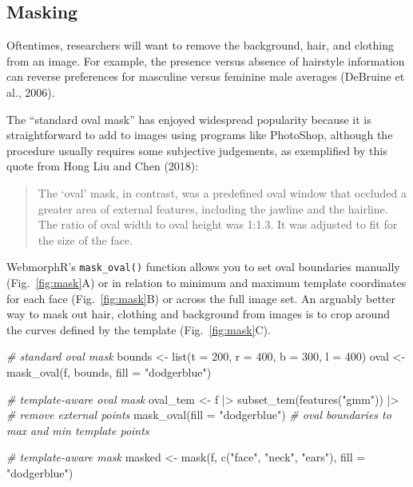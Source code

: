 \documentclass[
  doc,floatsintext]{apa6}
\newenvironment{Shaded}{\begin{snugshade}}{\end{snugshade}}
\newcommand{\AttributeTok}[1]{\textcolor[rgb]{0.77,0.63,0.00}{#1}}
\newcommand{\CommentTok}[1]{\textcolor[rgb]{0.56,0.35,0.01}{\textit{#1}}}
\newcommand{\DecValTok}[1]{\textcolor[rgb]{0.00,0.00,0.81}{#1}}
\newcommand{\FunctionTok}[1]{\textcolor[rgb]{0.00,0.00,0.00}{#1}}
\newcommand{\NormalTok}[1]{#1}
\newcommand{\OtherTok}[1]{\textcolor[rgb]{0.56,0.35,0.01}{#1}}
\newcommand{\SpecialCharTok}[1]{\textcolor[rgb]{0.00,0.00,0.00}{#1}}
\newcommand{\StringTok}[1]{\textcolor[rgb]{0.31,0.60,0.02}{#1}}
\begin{document}
\hypertarget{masking}{%
\subsection{Masking}\label{masking}}

Oftentimes, researchers will want to remove the background, hair, and clothing from an image. For example, the presence versus absence of hairstyle information can reverse preferences for masculine versus feminine male averages (DeBruine et al., 2006).

The ``standard oval mask'' has enjoyed widespread popularity because it is straightforward to add to images using programs like PhotoShop, although the procedure usually requires some subjective judgements, as exemplified by this quote from Hong Liu and Chen (2018):

\begin{quote}
The `oval' mask, in contrast, was a predefined oval window that occluded a greater area of external features, including the jawline and the hairline. The ratio of oval width to oval height was 1:1.3. It was adjusted to fit for the size of the face.
\end{quote}

WebmorphR's \texttt{mask\_oval()} function allows you to set oval boundaries manually (Fig.~\ref{fig:mask}A) or in relation to minimum and maximum template coordinates for each face (Fig.~\ref{fig:mask}B) or across the full image set. An arguably better way to mask out hair, clothing and background from images is to crop around the curves defined by the template (Fig.~\ref{fig:mask}C).

\begin{Shaded}
\begin{Highlighting}[]
\CommentTok{\# standard oval mask}
\NormalTok{bounds }\OtherTok{\textless{}{-}} \FunctionTok{list}\NormalTok{(}\AttributeTok{t =} \DecValTok{200}\NormalTok{, }\AttributeTok{r =} \DecValTok{400}\NormalTok{, }\AttributeTok{b =} \DecValTok{300}\NormalTok{, }\AttributeTok{l =} \DecValTok{400}\NormalTok{)}
\NormalTok{oval }\OtherTok{\textless{}{-}} \FunctionTok{mask\_oval}\NormalTok{(f, bounds, }\AttributeTok{fill =} \StringTok{"dodgerblue"}\NormalTok{)}

\CommentTok{\# template{-}aware oval mask}
\NormalTok{oval\_tem }\OtherTok{\textless{}{-}}\NormalTok{ f }\SpecialCharTok{|\textgreater{}}
  \FunctionTok{subset\_tem}\NormalTok{(}\FunctionTok{features}\NormalTok{(}\StringTok{"gmm"}\NormalTok{)) }\SpecialCharTok{|\textgreater{}} \CommentTok{\# remove external points}
  \FunctionTok{mask\_oval}\NormalTok{(}\AttributeTok{fill =} \StringTok{"dodgerblue"}\NormalTok{) }\CommentTok{\# oval boundaries to max and min template points}

\CommentTok{\# template{-}aware mask}
\NormalTok{masked }\OtherTok{\textless{}{-}} \FunctionTok{mask}\NormalTok{(f, }\FunctionTok{c}\NormalTok{(}\StringTok{"face"}\NormalTok{, }\StringTok{"neck"}\NormalTok{, }\StringTok{"ears"}\NormalTok{), }\AttributeTok{fill =} \StringTok{"dodgerblue"}\NormalTok{)}
\end{Highlighting}
\end{Shaded}
\end{document}
